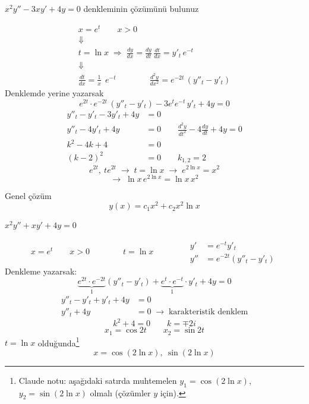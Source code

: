 \documentclass[11pt,a4paper]{article}
\begin{document}

\begin{ornek}
$x^2y'' - 3xy' + 4y = 0$ denkleminin çözümünü bulunuz
\end{ornek}
\begin{gather*}
x = e^t \qquad x>0\\
\Downarrow\\
t=\ln x \;\Rightarrow\; \frac{dy}{dx}=\frac{dy}{dt}\,\frac{dt}{dx} = y'_t\,e^{-t}\\
\Downarrow\\
\frac{dt}{dx}=\frac{1}{x}\ \ e^{-t} \qquad\qquad \frac{d^2y}{dx^2}=e^{-2t}\,(y''_t-y'_t)
\end{gather*}
Denklemde yerine yazarsak
\[ e^{2t}\cdot e^{-2t}\,(y''_t - y'_t) - 3e^{t}e^{-t}\,y'_t + 4y = 0 \]
\begin{align*}
y''_t - y'_t - 3y'_t + 4y &= 0\\
y''_t - 4y'_t + 4y &= 0 \qquad \frac{d^2y}{dt^2} - 4\frac{dy}{dt} + 4y = 0\\
k^2 - 4k + 4 &= 0\\
(k-2)^2 &= 0 \qquad k_{1,2} = 2
\end{align*}
\[ e^{2t},\ te^{2t} \;\rightarrow\; t=\ln x \;\rightarrow\; e^{2\ln x} = x^2 \]
\[ \rightarrow\; \ln x\, e^{2\ln x} = \ln x\, x^2 \]

Genel çözüm
\[ y(x) = c_1x^2 + c_2x^2\ln x \]

\begin{ornek}
$x^2y'' + xy' + 4y = 0$
\end{ornek}
\[ x=e^t \qquad x>0 \qquad\qquad t=\ln x \qquad\qquad
\begin{aligned} y' &= e^{-t}y'_t\\ y'' &= e^{-2t}(y''_t - y'_t)\end{aligned} \]
Denkleme yazarsak:
\[ \underbrace{e^{2t}\cdot e^{-2t}}_{1}(y''_t - y'_t) + \underbrace{e^{t}\cdot e^{-t}}_{1}\cdot y'_t + 4y = 0 \]
\begin{align*}
y''_t - y'_t + y'_t + 4y &= 0\\
y''_t + 4y &= 0 \;\rightarrow\; \text{karakteristik denklem}
\end{align*}
\[ k^2+4=0 \qquad k=\mp 2i \]
\[ x_1 = \cos 2t \qquad x_2 = \sin 2t \]
$t=\ln x$ olduğunda\footnote{Claude notu: aşağıdaki satırda muhtemelen $y_1=\cos(2\ln x)$, $y_2=\sin(2\ln x)$ olmalı (çözümler $y$ için).}
\[ x = \cos(2\ln x),\ \sin(2\ln x) \]
\end{document}
